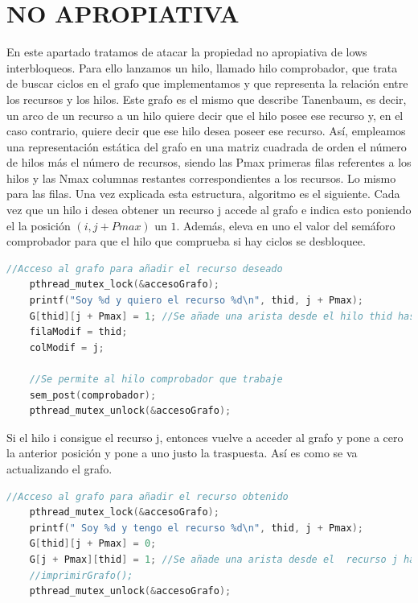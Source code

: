 \documentclass[10 pt,spanish]{article}  %
\begin{document}
\section{NO APROPIATIVA}
En este apartado tratamos de atacar la propiedad no apropiativa de lows interbloqueos. Para ello lanzamos un hilo, llamado hilo comprobador, que trata de buscar ciclos en el grafo que implementamos y que representa la relación entre los recursos y los hilos. Este grafo es el mismo que describe Tanenbaum, es decir, un arco de un recurso a un hilo quiere decir que el hilo posee ese recurso y, en el caso contrario, quiere decir que ese hilo desea poseer ese recurso. Así, empleamos una representación estática del grafo en una matriz cuadrada de orden el número de hilos más el número de recursos, siendo las Pmax primeras filas referentes a los hilos y las Nmax columnas restantes correspondientes a los recursos. Lo mismo para las filas.
Una vez explicada esta estructura, algoritmo es el siguiente. Cada vez que un hilo i desea obtener un recurso j accede al grafo e indica esto poniendo el la posición $(i, j + Pmax)$ un $1$. Además, eleva en uno el valor del semáforo comprobador para que el hilo que comprueba si hay ciclos se desbloquee.
\begin{lstlisting}[language=C++,caption=Acceso al grafo al desear recurso]
     //Acceso al grafo para añadir el recurso deseado
    pthread_mutex_lock(&accesoGrafo);
    printf("Soy %d y quiero el recurso %d\n", thid, j + Pmax);
    G[thid][j + Pmax] = 1; //Se añade una arista desde el hilo thid hasta el recurso j
    filaModif = thid;
    colModif = j;

    //Se permite al hilo comprobador que trabaje
    sem_post(comprobador);
    pthread_mutex_unlock(&accesoGrafo);
\end{lstlisting}
Si el hilo i consigue el recurso j, entonces vuelve a acceder al grafo y pone a cero la anterior posición y pone a uno justo la traspuesta. Así es como se va actualizando el grafo.
\begin{lstlisting}[language=C++,caption=Acceso al grafo al obtener un recurso]
     //Acceso al grafo para añadir el recurso obtenido
    pthread_mutex_lock(&accesoGrafo);
    printf(" Soy %d y tengo el recurso %d\n", thid, j + Pmax);
    G[thid][j + Pmax] = 0;
    G[j + Pmax][thid] = 1; //Se añade una arista desde el  recurso j hasta el hilo thid
    //imprimirGrafo();
    pthread_mutex_unlock(&accesoGrafo);
\end{lstlisting}
\end{document}

